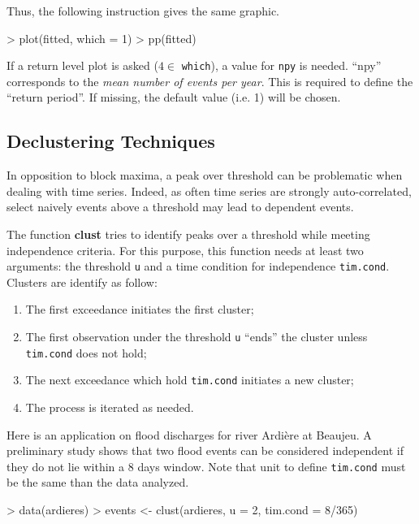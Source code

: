 \documentclass[a4paper]{article}
\numberwithin{equation}{section}
\theoremstyle{definition}
\begin{document}
Thus, the following instruction gives the same graphic.

\begin{Schunk}
\begin{Sinput}
> plot(fitted, which = 1)
> pp(fitted)
\end{Sinput}
\end{Schunk}

If a return level plot is asked ($4 \in$ \verb|which|), a value for
\verb|npy| is needed. ``npy'' corresponds to the \emph{mean number of
  events per year}. This is required to define the ``return
period''. If missing, the default value (i.e. 1) will be chosen.

\subsection{Declustering Techniques}
\label{subsec:declust}

In opposition to block maxima, a peak over threshold can be
problematic when dealing with time series. Indeed, as often time
series are strongly auto-correlated, select naively events above a
threshold may lead to dependent events.

The function \textbf{clust} tries to identify peaks over a threshold
while meeting independence criteria. For this purpose, this function
needs at least two arguments: the threshold \verb|u| and a time
condition for independence \verb|tim.cond|. Clusters are identify as
follow:
\begin{enumerate}
\item The first exceedance initiates the first cluster;
\item The first observation under the threshold \verb|u| ``ends'' the
  cluster unless \verb|tim.cond| does not hold;
\item The next exceedance which hold \verb|tim.cond| initiates a new
  cluster;
\item The process is iterated as needed.
\end{enumerate}

Here is an application on flood discharges for river Ardi\`ere at
Beaujeu. A preliminary study shows that two flood events can be
considered independent if they do not lie within a 8 days window. Note
that unit to define \verb|tim.cond| must be the same than the data
analyzed. 
\begin{Schunk}
\begin{Sinput}
> data(ardieres)
> events <- clust(ardieres, u = 2, tim.cond = 8/365)
\end{Sinput}
\end{Schunk}
\end{document}

